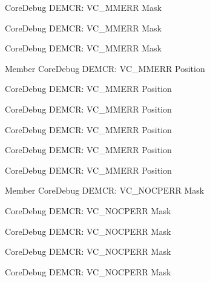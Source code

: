 \begin{DoxyRefList}
\label{deprecated__deprecated000068}%
%
Core\+Debug DEMCR\+: VC\+\_\+\+MMERR Mask 

\label{deprecated__deprecated000621}%
%
Core\+Debug DEMCR\+: VC\+\_\+\+MMERR Mask 

\label{deprecated__deprecated000519}%
%
Core\+Debug DEMCR\+: VC\+\_\+\+MMERR Mask  
\item[Member \doxylink{group__CMSIS__CoreDebug_ga444454f7c7748e76cd76c3809c887c41}{Core\+Debug\+\_\+\+DEMCR\+\_\+\+VC\+\_\+\+MMERR\+\_\+\+Pos} ]\label{deprecated__deprecated000429}%
%
Core\+Debug DEMCR\+: VC\+\_\+\+MMERR Position 

\label{deprecated__deprecated000353}%
%
Core\+Debug DEMCR\+: VC\+\_\+\+MMERR Position 

\label{deprecated__deprecated000067}%
%
Core\+Debug DEMCR\+: VC\+\_\+\+MMERR Position 

\label{deprecated__deprecated000518}%
%
Core\+Debug DEMCR\+: VC\+\_\+\+MMERR Position 

\label{deprecated__deprecated000620}%
%
Core\+Debug DEMCR\+: VC\+\_\+\+MMERR Position 

\label{deprecated__deprecated000211}%
%
Core\+Debug DEMCR\+: VC\+\_\+\+MMERR Position  
\item[Member \doxylink{group__CMSIS__CoreDebug_ga03ee58b1b02fdbf21612809034562f1c}{Core\+Debug\+\_\+\+DEMCR\+\_\+\+VC\+\_\+\+NOCPERR\+\_\+\+Msk} ]\label{deprecated__deprecated000428}%
%
Core\+Debug DEMCR\+: VC\+\_\+\+NOCPERR Mask 

\label{deprecated__deprecated000352}%
%
Core\+Debug DEMCR\+: VC\+\_\+\+NOCPERR Mask 

\label{deprecated__deprecated000517}%
%
Core\+Debug DEMCR\+: VC\+\_\+\+NOCPERR Mask 

\label{deprecated__deprecated000619}%
%
Core\+Debug DEMCR\+: VC\+\_\+\+NOCPERR Mask 

\label{deprecated__deprecated000210}%
%
Core\+Debug DEMCR\+: VC\+\_\+\+NOCPERR Mask 


\end{DoxyRefList}
